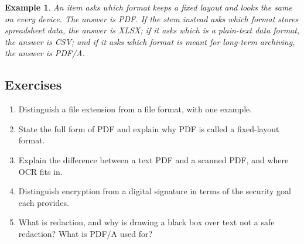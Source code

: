 \documentclass[11pt]{article}
\newtheorem{example}{Example}[section]
\begin{document}
\begin{example}
An item asks which format keeps a fixed layout and looks the same on every
device. The answer is PDF. If the stem instead asks which format stores
spreadsheet data, the answer is XLSX; if it asks which is a plain-text data
format, the answer is CSV; and if it asks which format is meant for long-term
archiving, the answer is PDF/A.
\end{example}

\subsection*{Exercises}
\begin{enumerate}[label=\arabic*.]
  \item Distinguish a file extension from a file format, with one example.
  \item State the full form of PDF and explain why PDF is called a
    fixed-layout format.
  \item Explain the difference between a text PDF and a scanned PDF, and
    where OCR fits in.
  \item Distinguish encryption from a digital signature in terms of the
    security goal each provides.
  \item What is redaction, and why is drawing a black box over text not a
    safe redaction? What is PDF/A used for?
\end{enumerate}
\end{document}

